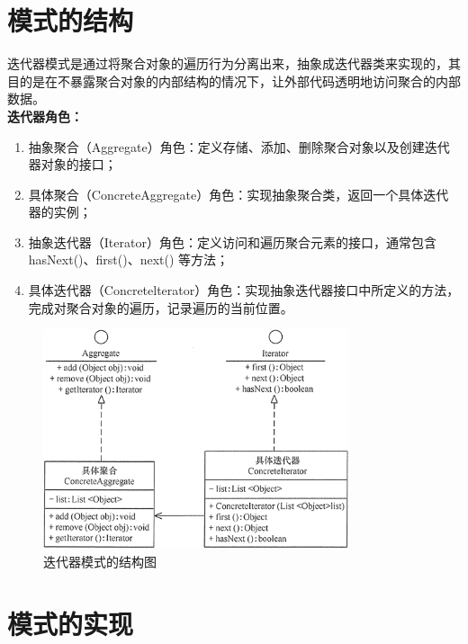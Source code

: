 \section{模式的结构}
迭代器模式是通过将聚合对象的遍历行为分离出来，抽象成迭代器类来实现的，其目的是在不暴露聚合对象的内部结构的情况下，让外部代码透明地访问聚合的内部数据。
\\ \textbf{迭代器角色：}
\begin{enumerate}
	\item 抽象聚合（Aggregate）角色：定义存储、添加、删除聚合对象以及创建迭代器对象的接口；
	\item 具体聚合（ConcreteAggregate）角色：实现抽象聚合类，返回一个具体迭代器的实例；
	\item 抽象迭代器（Iterator）角色：定义访问和遍历聚合元素的接口，通常包含 hasNext()、first()、next() 等方法；
	\item 具体迭代器（Concretelterator）角色：实现抽象迭代器接口中所定义的方法，完成对聚合对象的遍历，记录遍历的当前位置。
\end{enumerate}
\begin{figure}[!h]
	\centering
	\includegraphics[width=0.8\textwidth]{image/1-1}
	\caption{迭代器模式的结构图}
\end{figure}
\section{模式的实现}
